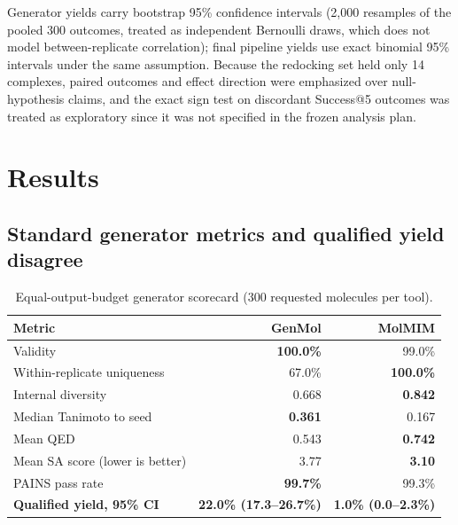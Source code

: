 \documentclass{article}
\begin{document}
Generator yields carry bootstrap 95\% confidence intervals (2{,}000 resamples of the pooled 300 outcomes, treated as independent Bernoulli draws, which does not model between-replicate correlation); final pipeline yields use exact binomial 95\% intervals under the same assumption. Because the redocking set held only 14 complexes, paired outcomes and effect direction were emphasized over null-hypothesis claims, and the exact sign test on discordant Success@5 outcomes was treated as exploratory since it was not specified in the frozen analysis plan.

\section{Results}

\subsection{Standard generator metrics and qualified yield disagree}

\begin{table}[t]
  \caption{Equal-output-budget generator scorecard (300 requested molecules per tool).}
  \label{tab:generator}
  \centering
  \footnotesize
  \begin{tabular}{lrr}
    \toprule
    Metric & GenMol & MolMIM \\
    \midrule
    Validity & \textbf{100.0\%} & 99.0\% \\
    Within-replicate uniqueness & 67.0\% & \textbf{100.0\%} \\
    Internal diversity & 0.668 & \textbf{0.842} \\
    Median Tanimoto to seed & \textbf{0.361} & 0.167 \\
    Mean QED & 0.543 & \textbf{0.742} \\
    Mean SA score (lower is better) & 3.77 & \textbf{3.10} \\
    PAINS pass rate & \textbf{99.7\%} & 99.3\% \\
    \textbf{Qualified yield, 95\% CI} & \textbf{22.0\% (17.3--26.7\%)} & \textbf{1.0\% (0.0--2.3\%)} \\
    \bottomrule
  \end{tabular}
\end{table}
\end{document}
